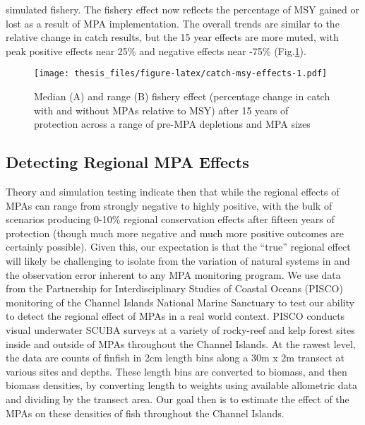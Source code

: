 \documentclass[twoside,12pt,final]{ucthesis-CA2012}
\begin{document}
\begin{ucmainmatter}
simulated fishery. The fishery effect now reflects the percentage of MSY
gained or lost as a result of MPA implementation. The overall trends are
similar to the relative change in catch results, but the 15 year effects
are more muted, with peak positive effects near 25\% and negative
effects near -75\% (Fig.\ref{fig:catch-msy-effects}).
\begin{figure}
\centering
\texttt{[image: thesis\_files/figure-latex/catch-msy-effects-1.pdf]}
\caption{\label{fig:catch-msy-effects}Median (A) and range (B) fishery
effect (percentage change in catch with and without MPAs relative to
MSY) after 15 years of protection across a range of pre-MPA depletions
and MPA sizes}
\end{figure}
\subsection{Detecting Regional MPA
Effects}\label{detecting-regional-mpa-effects}

Theory and simulation testing indicate then that while the regional
effects of MPAs can range from strongly negative to highly positive,
with the bulk of scenarios producing 0-10\% regional conservation
effects after fifteen years of protection (though much more negative and
much more positive outcomes are certainly possible). Given this, our
expectation is that the ``true'' regional effect will likely be
challenging to isolate from the variation of natural systems in and the
observation error inherent to any MPA monitoring program. We use data
from the Partnership for Interdisciplinary Studies of Coastal Oceans
(PISCO) monitoring of the Channel Islands National Marine Sanctuary to
test our ability to detect the regional effect of MPAs in a real world
context. PISCO conducts visual underwater SCUBA surveys at a variety of
rocky-reef and kelp forest sites inside and outside of MPAs throughout
the Channel Islands. At the rawest level, the data are counts of finfish
in 2cm length bins along a 30m x 2m transect at various sites and
depths. These length bins are converted to biomass, and then biomass
densities, by converting length to weights using available allometric
data and dividing by the transect area. Our goal then is to estimate the
effect of the MPAs on these densities of fish throughout the Channel
Islands.


\end{ucmainmatter}
\end{document}

